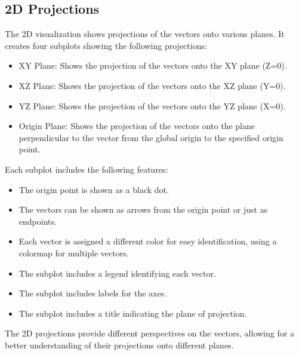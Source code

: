 \subsection{2D Projections}

The 2D visualization shows projections of the vectors onto various planes. It creates four subplots showing the following projections:

\begin{itemize}
    \item XY Plane: Shows the projection of the vectors onto the XY plane (Z=0).
    \item XZ Plane: Shows the projection of the vectors onto the XZ plane (Y=0).
    \item YZ Plane: Shows the projection of the vectors onto the YZ plane (X=0).
    \item Origin Plane: Shows the projection of the vectors onto the plane perpendicular to the vector from the global origin to the specified origin point.
\end{itemize}

Each subplot includes the following features:

\begin{itemize}
    \item The origin point is shown as a black dot.
    \item The vectors can be shown as arrows from the origin point or just as endpoints.
    \item Each vector is assigned a different color for easy identification, using a colormap for multiple vectors.
    \item The subplot includes a legend identifying each vector.
    \item The subplot includes labels for the axes.
    \item The subplot includes a title indicating the plane of projection.
\end{itemize}

The 2D projections provide different perspectives on the vectors, allowing for a better understanding of their projections onto different planes.

